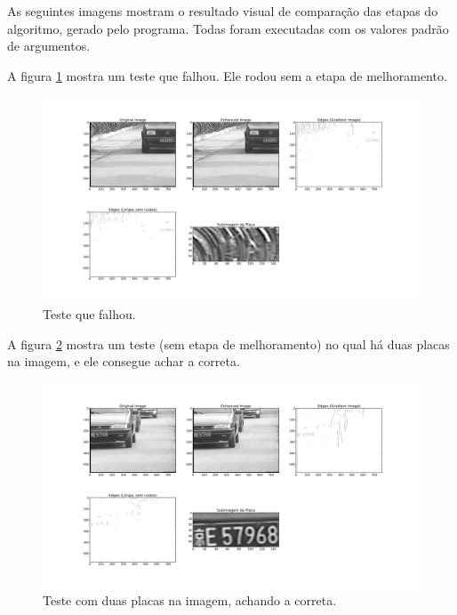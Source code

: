 As seguintes imagens mostram o resultado visual de comparação das etapas do algoritmo, gerado pelo programa.
Todas foram executadas com os valores padrão de argumentos.

A figura \ref{errado} mostra um teste que falhou. Ele rodou sem a etapa de melhoramento.
\begin{figure}
  \centering
  \includegraphics[clip=true, trim=185 20 150 20, scale=0.4]{errado.png}
  \caption{Teste que falhou.}
  \label{errado}
\end{figure}

A figura \ref{duasplacas} mostra um teste (sem etapa de melhoramento) no qual há duas placas na imagem, e ele consegue achar a correta.
\begin{figure}
  \centering
  \includegraphics[clip=true, trim=185 20 150 20, scale=0.4]{duasPlacasCerto.png}
  \caption{Teste com duas placas na imagem, achando a correta.}
  \label{duasplacas}
\end{figure}

